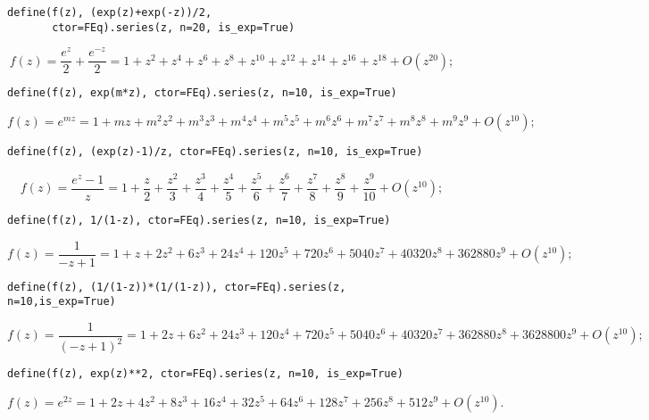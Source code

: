 \begin{verbatim}
define(f(z), (exp(z)+exp(-z))/2,
       ctor=FEq).series(z, n=20, is_exp=True)
\end{verbatim}
\begin{displaymath}
f{\left (z \right )} = \frac{e^{z}}{2} + \frac{e^{- z}}{2} = 1 + z^{2} + z^{4} + z^{6} + z^{8} + z^{10} + z^{12} + z^{14} + z^{16} + z^{18} + O\left(z^{20}\right);
\end{displaymath}

\begin{verbatim}
define(f(z), exp(m*z), ctor=FEq).series(z, n=10, is_exp=True)
\end{verbatim}
\begin{displaymath}
f{\left (z \right )} = e^{m z} = 1 + m z + m^{2} z^{2} + m^{3} z^{3} + m^{4} z^{4} + m^{5} z^{5} + m^{6} z^{6} + m^{7} z^{7} + m^{8} z^{8} + m^{9} z^{9} + O\left(z^{10}\right);
\end{displaymath}

\begin{verbatim}
define(f(z), (exp(z)-1)/z, ctor=FEq).series(z, n=10, is_exp=True)
\end{verbatim}
\begin{displaymath}
f{\left (z \right )} = \frac{e^{z} - 1}{z} = 1 + \frac{z}{2} + \frac{z^{2}}{3} + \frac{z^{3}}{4} + \frac{z^{4}}{5} + \frac{z^{5}}{6} + \frac{z^{6}}{7} + \frac{z^{7}}{8} + \frac{z^{8}}{9} + \frac{z^{9}}{10} + O\left(z^{10}\right);
\end{displaymath}

\begin{verbatim}
define(f(z), 1/(1-z), ctor=FEq).series(z, n=10, is_exp=True)
\end{verbatim}
\begin{displaymath}
f{\left (z \right )} = \frac{1}{- z + 1} = 1 + z + 2 z^{2} + 6 z^{3} + 24 z^{4} + 120 z^{5} + 720 z^{6} + 5040 z^{7} + 40320 z^{8} + 362880 z^{9} + O\left(z^{10}\right);
\end{displaymath}

\begin{verbatim}
define(f(z), (1/(1-z))*(1/(1-z)), ctor=FEq).series(z, n=10,is_exp=True)
\end{verbatim}
\begin{displaymath}
f{\left (z \right )} = \frac{1}{\left(- z + 1\right)^{2}} = 1 + 2 z + 6 z^{2} + 24 z^{3} + 120 z^{4} + 720 z^{5} + 5040 z^{6} + 40320 z^{7} + 362880 z^{8} + 3628800 z^{9} + O\left(z^{10}\right);
\end{displaymath}

\begin{verbatim}
define(f(z), exp(z)**2, ctor=FEq).series(z, n=10, is_exp=True)
\end{verbatim}
\begin{displaymath}
f{\left (z \right )} = e^{2 z} = 1 + 2 z + 4 z^{2} + 8 z^{3} + 16 z^{4} + 32 z^{5} + 64 z^{6} + 128 z^{7} + 256 z^{8} + 512 z^{9} + O\left(z^{10}\right).
\end{displaymath}


